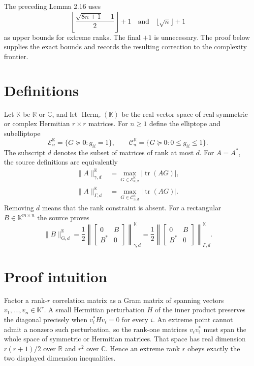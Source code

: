 \documentclass[11pt]{article}
\newcommand{\R}{\mathbb R}
\newcommand{\C}{\mathbb C}
\newcommand{\Ecal}{\mathcal E}
\newcommand{\Ccal}{\mathcal C}
\newcommand{\Herm}{\operatorname{Herm}}
\begin{document}
The preceding Lemma 2.16 uses
\[
 \left\lfloor\frac{\sqrt{8n+1}-1}{2}\right\rfloor+1
 \quad\text{and}\quad \lfloor\sqrt n\rfloor+1
\]
as upper bounds for extreme ranks.  The final $+1$ is unnecessary.  The
proof below supplies the exact bounds and records the resulting correction
to the complexity frontier.

\section{Definitions}

Let $\mathbb K$ be $\R$ or $\C$, and let $\Herm_r(\mathbb K)$ be the real
vector space of real symmetric or complex Hermitian $r\times r$ matrices.
For $n\ge1$ define the elliptope and subelliptope
\[
 \Ecal_n^{\mathbb K}=\{G\succeq0:g_{ii}=1\},\qquad
 \Ccal_n^{\mathbb K}=\{G\succeq0:0\le g_{ii}\le1\}.
\]
The subscript $d$ denotes the subset of matrices of rank at most $d$.
For $A=A^*$, the source definitions are equivalently
\begin{align*}
 \|A\|_{\gamma,d}^{\mathbb K}
   &=\max_{G\in\Ecal_{n,d}^{\mathbb K}}|\operatorname{tr}(AG)|,\\
 \|A\|_{\Gamma,d}^{\mathbb K}
   &=\max_{G\in\Ccal_{n,d}^{\mathbb K}}|\operatorname{tr}(AG)|.
\end{align*}
Removing $d$ means that the rank constraint is absent.  For a rectangular
$B\in\mathbb K^{m\times n}$ the source proves
\begin{equation}\label{eq:block}
 \|B\|_{\mathrm G,d}^{\mathbb K}
 =\frac12\left\|\begin{bmatrix}0&B\\B^*&0\end{bmatrix}\right\|_{
 \gamma,d}^{\mathbb K}
 =\frac12\left\|\begin{bmatrix}0&B\\B^*&0\end{bmatrix}\right\|_{
 \Gamma,d}^{\mathbb K}.
\end{equation}

\section{Proof intuition}

Factor a rank-$r$ correlation matrix as a Gram matrix of spanning vectors
$v_1,\ldots,v_n\in\mathbb K^r$.  A small Hermitian perturbation $H$ of the
inner product preserves the diagonal precisely when
$v_i^*Hv_i=0$ for every $i$.  An extreme point cannot admit a nonzero such
perturbation, so the rank-one matrices $v_iv_i^*$ must span the whole space
of symmetric or Hermitian matrices.  That space has real dimension
$r(r+1)/2$ over $\R$ and $r^2$ over $\C$.  Hence an extreme rank $r$ obeys
exactly the two displayed dimension inequalities.
\end{document}
